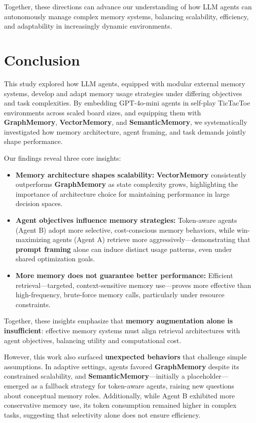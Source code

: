 \documentclass[10pt]{article}
\begin{document}
Together, these directions can advance our understanding of how LLM agents can autonomously manage complex memory systems, balancing scalability, efficiency, and adaptability in increasingly dynamic environments.

\section{Conclusion}

This study explored how LLM agents, equipped with modular external memory systems, develop and adapt memory usage strategies under differing objectives and task complexities. By embedding GPT-4o-mini agents in self-play TicTacToe environments across scaled board sizes, and equipping them with \textbf{GraphMemory}, \textbf{VectorMemory}, and \textbf{SemanticMemory}, we systematically investigated how memory architecture, agent framing, and task demands jointly shape performance.

Our findings reveal three core insights:

\begin{itemize}[leftmargin=*,nosep]
\item \textbf{Memory architecture shapes scalability:} \textbf{VectorMemory} consistently outperforms \textbf{GraphMemory} as state complexity grows, highlighting the importance of architecture choice for maintaining performance in large decision spaces.
\item \textbf{Agent objectives influence memory strategies:} Token-aware agents (Agent B) adopt more selective, cost-conscious memory behaviors, while win-maximizing agents (Agent A) retrieve more aggressively—demonstrating that \textbf{prompt framing} alone can induce distinct usage patterns, even under shared optimization goals.
\item \textbf{More memory does not guarantee better performance:} Efficient retrieval—targeted, context-sensitive memory use—proves more effective than high-frequency, brute-force memory calls, particularly under resource constraints.
\end{itemize}

Together, these insights emphasize that \textbf{memory augmentation alone is insufficient}: effective memory systems must align retrieval architectures with agent objectives, balancing utility and computational cost.

However, this work also surfaced \textbf{unexpected behaviors} that challenge simple assumptions. In adaptive settings, agents favored \textbf{GraphMemory} despite its constrained scalability, and \textbf{SemanticMemory}—initially a placeholder—emerged as a fallback strategy for token-aware agents, raising new questions about conceptual memory roles. Additionally, while Agent B exhibited more conservative memory use, its token consumption remained higher in complex tasks, suggesting that selectivity alone does not ensure efficiency.
\end{document}
